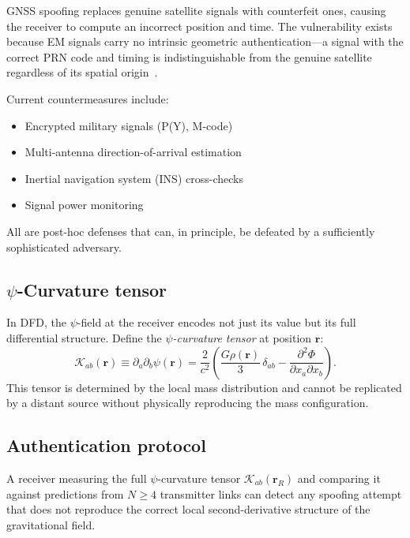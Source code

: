 \documentclass[aps,prd,twocolumn,superscriptaddress,nofootinbib]{revtex4-2}
\begin{document}
GNSS spoofing replaces genuine satellite signals with counterfeit ones,
causing the receiver to compute an incorrect position and time. The
vulnerability exists because EM signals carry no intrinsic geometric
authentication---a signal with the correct PRN code and timing is
indistinguishable from the genuine satellite regardless of its
spatial origin~\cite{Humphreys2008,Psiaki2016}.

Current countermeasures include:
\begin{itemize}
\item Encrypted military signals (P(Y), M-code)
\item Multi-antenna direction-of-arrival estimation
\item Inertial navigation system (INS) cross-checks
\item Signal power monitoring
\end{itemize}
All are post-hoc defenses that can, in principle, be defeated by a
sufficiently sophisticated adversary.

\subsection{$\psi$-Curvature tensor}\label{sec:curvature-tensor}

In DFD, the $\psi$-field at the receiver encodes not just its value
but its full differential structure. Define the
\textit{$\psi$-curvature tensor} at position $\mathbf{r}$:
\begin{equation}\label{eq:curv-tensor}
\mathcal{K}_{ab}(\mathbf{r}) \equiv \partial_a\partial_b\psi(\mathbf{r})
= \frac{2}{c^2}\left(\frac{G\rho(\mathbf{r})}{3}\,\delta_{ab}
- \frac{\partial^2\Phi}{\partial x_a\partial x_b}\right).
\end{equation}
This tensor is determined by the local mass distribution and cannot
be replicated by a distant source without physically reproducing the
mass configuration.

\subsection{Authentication protocol}\label{sec:auth}

\begin{theorem}\label{thm:auth}
A receiver measuring the full $\psi$-curvature tensor
$\mathcal{K}_{ab}(\mathbf{r}_R)$ and comparing it against
predictions from $N \geq 4$ transmitter links can detect any spoofing
attempt that does not reproduce the correct local second-derivative
structure of the gravitational field.
\end{theorem}
\end{document}
